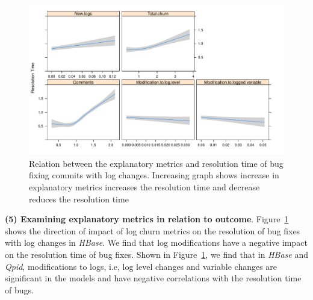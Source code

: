 \begin{figure}[t]
	\begin{minipage}{0.5\columnwidth}
		\hspace*{1.9cm}	\includegraphics[width=1.45\textwidth]{HbaseDirectionPlot}

	\end{minipage}
	\hspace*{1.cm}\caption{Relation between the explanatory metrics and resolution time of bug fixing commits with log changes. Increasing graph shows increase in explanatory metrics increases the resolution time and decrease reduces the resolution time \label{fig:HbaseDirectionPlot}}
\end{figure}

\textbf{(5) Examining explanatory metrics in relation to outcome}. Figure~\ref{fig:HbaseDirectionPlot} shows the direction of impact of log churn metrics on the resolution of bug fixes with log changes in \emph{HBase}. We find that log modifications have a negative impact on the resolution time of bug fixes. Shown in Figure~\ref{fig:HbaseDirectionPlot}, we find that in \emph{HBase} and \emph{Qpid}, modifications to logs, i.e, log level changes and variable changes are significant in the models and have negative correlations with the resolution time of bugs. 

